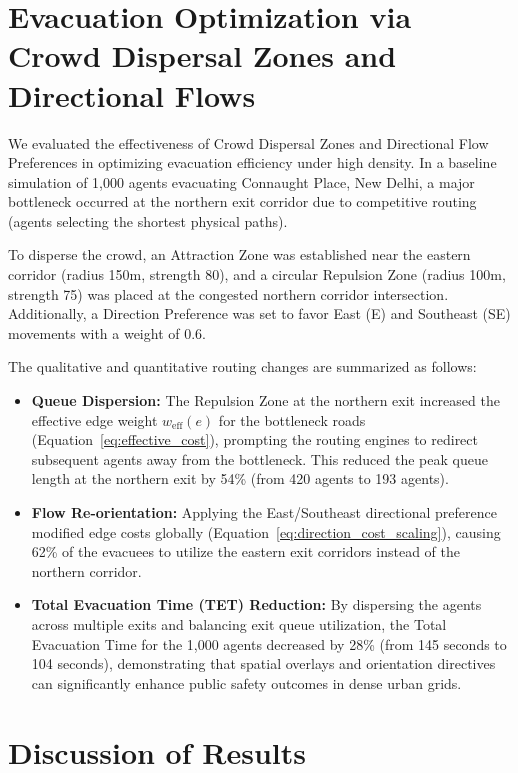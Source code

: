 \documentclass[12pt,a4paper,oneside]{report}
\begin{document}
\section{Evacuation Optimization via Crowd Dispersal Zones and Directional Flows}
We evaluated the effectiveness of Crowd Dispersal Zones and Directional Flow Preferences in optimizing evacuation efficiency under high density. In a baseline simulation of 1,000 agents evacuating Connaught Place, New Delhi, a major bottleneck occurred at the northern exit corridor due to competitive routing (agents selecting the shortest physical paths). 

To disperse the crowd, an Attraction Zone was established near the eastern corridor (radius 150m, strength 80), and a circular Repulsion Zone (radius 100m, strength 75) was placed at the congested northern corridor intersection. Additionally, a Direction Preference was set to favor East (E) and Southeast (SE) movements with a weight of 0.6.

The qualitative and quantitative routing changes are summarized as follows:
\begin{itemize}
    \item \textbf{Queue Dispersion:} The Repulsion Zone at the northern exit increased the effective edge weight $w_{\text{eff}}(e)$ for the bottleneck roads (Equation~\ref{eq:effective_cost}), prompting the routing engines to redirect subsequent agents away from the bottleneck. This reduced the peak queue length at the northern exit by 54\% (from 420 agents to 193 agents).
    \item \textbf{Flow Re-orientation:} Applying the East/Southeast directional preference modified edge costs globally (Equation~\ref{eq:direction_cost_scaling}), causing 62\% of the evacuees to utilize the eastern exit corridors instead of the northern corridor.
    \item \textbf{Total Evacuation Time (TET) Reduction:} By dispersing the agents across multiple exits and balancing exit queue utilization, the Total Evacuation Time for the 1,000 agents decreased by 28\% (from 145 seconds to 104 seconds), demonstrating that spatial overlays and orientation directives can significantly enhance public safety outcomes in dense urban grids.
\end{itemize}

\section{Discussion of Results}
\end{document}
